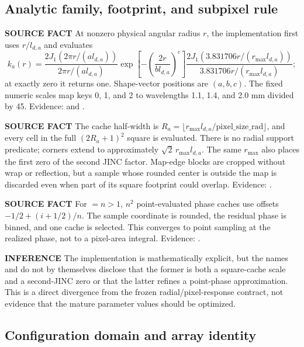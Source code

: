 \documentclass[10pt]{article}
\newcommand{\srclabel}{\textbf{SOURCE FACT}}
\newcommand{\inflabel}{\textbf{INFERENCE}}
\begin{document}
\subsection{Analytic family, footprint, and subpixel rule}

\srclabel{} At nonzero physical angular radius $r$, the implementation first
uses $r/l_{d,a}$ and evaluates
\begin{equation}
 k_a(r)=
 \frac{2J_1(2\pi r/(a l_{d,a}))}{2\pi r/(a l_{d,a})}
 \exp\!\left[-\left(\frac{2r}{b l_{d,a}}\right)^c\right]
 \frac{2J_1(3.831706 r/(r_{\max}l_{d,a}))}
      {3.831706 r/(r_{\max}l_{d,a})};
 \label{eq:implkernel}
\end{equation}
at exactly zero it returns one.  Shape-vector positions are $(a,b,c)$.
The fixed numeric scales map keys 0, 1, and 2 to wavelengths 1.1, 1.4, and
2.0 mm divided by 45.  Evidence:
 and
.

\srclabel{} The cache half-width is
$R_a=\lfloor r_{\max}l_{d,a}/\mathrm{pixel\_size\_rad}\rfloor$, and every
cell in the full $(2R_a+1)^2$ square is evaluated.  There is no radial support
predicate; corners extend to approximately $\sqrt{2}\,r_{\max}l_{d,a}$.
The same $r_{\max}$ also places the first zero of the second JINC factor.
Map-edge blocks are cropped without wrap or reflection, but a sample whose
rounded center is outside the map is discarded even when part of its square
footprint could overlap.  Evidence: .

\srclabel{} For $=n>1$, $n^2$ point-evaluated phase caches
use offsets $-1/2+(i+1/2)/n$.  The sample coordinate is rounded, the residual
phase is binned, and one cache is selected.  This converges to point sampling
at the realized phase, not to a pixel-area integral.  Evidence:
.

\inflabel{} The implementation is mathematically explicit, but the names
 and  do not by themselves disclose that
the former is both a square-cache scale and a second-JINC zero or that the
latter refines a point-phase approximation.  This is a direct divergence from
the frozen radial/pixel-response contract, not evidence that the mature
parameter values should be optimized.

\subsection{Configuration domain and array identity}
\end{document}
